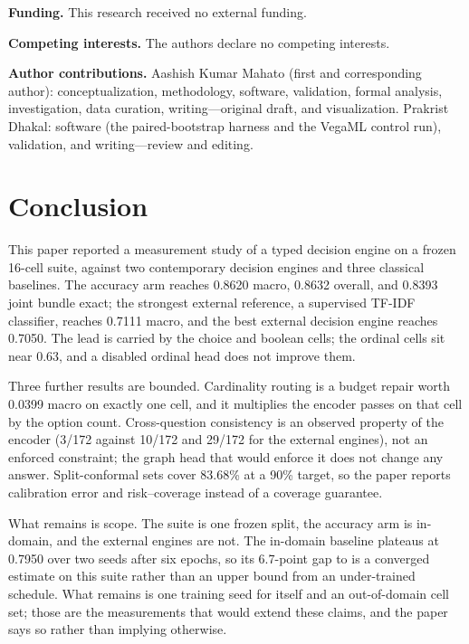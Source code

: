 \textbf{Funding.} This research received no external funding.

\textbf{Competing interests.} The authors declare no competing interests.

\textbf{Author contributions.} Aashish Kumar Mahato (first and corresponding author):
conceptualization, methodology, software,
validation, formal analysis, investigation, data curation, writing---original draft, and
visualization. Prakrist Dhakal: software (the paired-bootstrap harness and the VegaML control
run), validation, and writing---review and editing.

\section{Conclusion}
\label{sec:conclusion}

This paper reported a measurement study of a typed decision engine on a frozen 16-cell suite,
against two contemporary decision engines and three classical baselines. The accuracy arm reaches
0.8620 macro, 0.8632 overall, and 0.8393 joint bundle exact; the strongest external reference, a
supervised TF-IDF classifier, reaches 0.7111 macro, and the best external decision engine reaches
0.7050. The lead is carried by the choice and boolean cells; the ordinal cells sit near 0.63, and a
disabled ordinal head does not improve them.

Three further results are bounded. Cardinality routing is a budget repair worth 0.0399 macro on
exactly one cell, and it multiplies the encoder passes on that cell by the option count.
Cross-question consistency is an observed property of the encoder (3/172 against 10/172 and 29/172
for the external engines), not an enforced constraint; the graph head that would enforce it does not
change any answer. Split-conformal sets cover 83.68\% at a 90\% target, so the paper reports
calibration error and risk--coverage instead of a coverage guarantee.

What remains is scope. The suite is one frozen split, the accuracy arm is in-domain, and the
external engines are not. The in-domain baseline plateaus at 0.7950 over two seeds after six
epochs, so its 6.7-point gap to \vsix{} is a converged estimate on this suite rather than an upper
bound from an under-trained schedule. What remains is one training seed for \vsix{} itself and an out-of-domain
cell set; those are the measurements that would extend these claims, and the paper says so rather
than implying otherwise.
